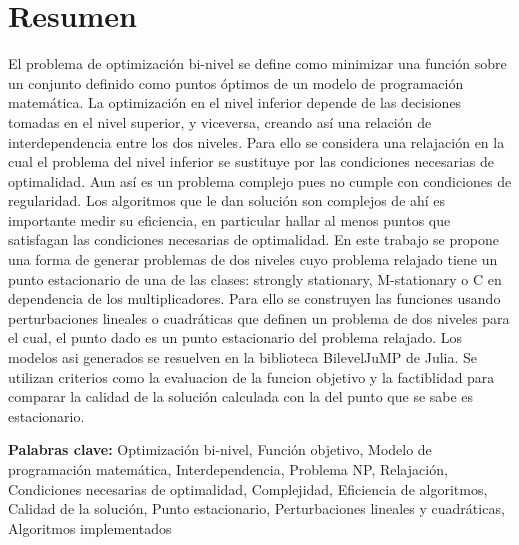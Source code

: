 \chapter*{Resumen}
El problema de optimización bi-nivel se define como minimizar una función sobre un conjunto definido como puntos óptimos de un modelo de programación matemática. La optimización en el nivel inferior depende de las decisiones tomadas en el nivel superior, y viceversa, creando así una relación de interdependencia entre los dos niveles.
Para ello se considera una relajación en la cual el problema del nivel inferior se sustituye por las condiciones necesarias de optimalidad. Aun así es un problema complejo pues no cumple con condiciones de regularidad. Los algoritmos que le dan solución son complejos de ahí es importante medir su eficiencia, en particular hallar al menos puntos que satisfagan las condiciones necesarias de optimalidad.
En este trabajo se propone una forma de generar problemas de dos niveles cuyo problema relajado tiene un punto estacionario de una de las clases: strongly stationary, M-stationary o C en dependencia de los multiplicadores.
Para ello se construyen las funciones usando perturbaciones lineales o cuadráticas que definen un problema de dos niveles para el cual, el punto dado es un punto estacionario del problema relajado. Los modelos asi generados se resuelven en la biblioteca BilevelJuMP de Julia. Se utilizan criterios como la evaluacion de la funcion objetivo y la factiblidad para comparar la calidad de la solución  calculada con la del punto que se sabe es estacionario.

\textbf{Palabras clave:} Optimización bi-nivel, Función objetivo, Modelo de programación matemática, Interdependencia, Problema NP, Relajación, Condiciones necesarias de optimalidad, Complejidad, Eficiencia de algoritmos, Calidad de la solución, Punto estacionario, Perturbaciones lineales y cuadráticas, Algoritmos implementados

